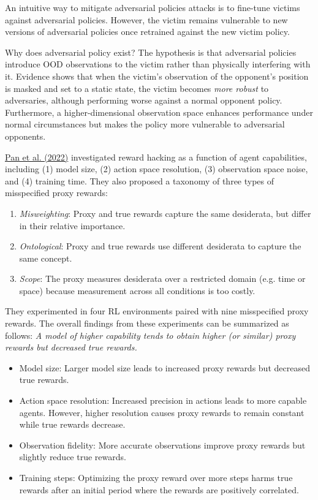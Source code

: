 An intuitive way to mitigate adversarial policies attacks is to fine-tune victims against adversarial policies. However, the victim remains vulnerable to new versions of adversarial policies once retrained against the new victim policy.

Why does adversarial policy exist? The hypothesis is that adversarial policies introduce OOD observations to the victim rather than physically interfering with it. Evidence shows that when the victim's observation of the opponent's position is masked and set to a static state, the victim becomes \emph{more robust} to adversaries, although performing worse against a normal opponent policy. Furthermore, a higher-dimensional observation space enhances performance under normal circumstances but makes the policy more vulnerable to adversarial opponents.

\href{https://arxiv.org/abs/2201.03544}{Pan et al. (2022)} investigated reward hacking as a function of agent capabilities, including (1) model size, (2) action space resolution, (3) observation space noise, and (4) training time. They also proposed a taxonomy of three types of misspecified proxy rewards:

\begin{enumerate}
\tightlist
\item
  \emph{Misweighting}: Proxy and true rewards capture the same desiderata, but differ in their relative importance.
\item
  \emph{Ontological}: Proxy and true rewards use different desiderata to capture the same concept.
\item
  \emph{Scope}: The proxy measures desiderata over a restricted domain (e.g. time or space) because measurement across all conditions is too costly.
\end{enumerate}

They experimented in four RL environments paired with nine misspecified proxy rewards. The overall findings from these experiments can be summarized as follows: \emph{A model of higher capability tends to obtain higher (or similar) proxy rewards but decreased true rewards.}

\begin{itemize}
\tightlist
\item
  Model size: Larger model size leads to increased proxy rewards but decreased true rewards.
\item
  Action space resolution: Increased precision in actions leads to more capable agents. However, higher resolution causes proxy rewards to remain constant while true rewards decrease.
\item
  Observation fidelity: More accurate observations improve proxy rewards but slightly reduce true rewards.
\item
  Training steps: Optimizing the proxy reward over more steps harms true rewards after an initial period where the rewards are positively correlated.
\end{itemize}

